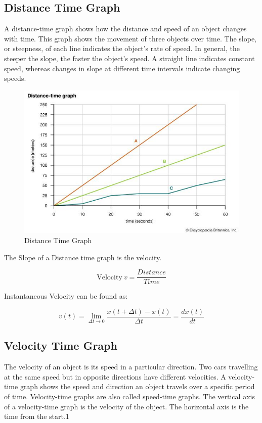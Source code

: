 \documentclass[11pt]{article}
\begin{document}
\subsection{Distance Time Graph}
A distance-time graph shows how the distance and speed of an object changes with time. This graph shows the movement of three objects over time. The slope, or steepness, of each line indicates the object's rate of speed. In general, the steeper the slope, the faster the object's speed. A straight line indicates constant speed, whereas changes in slope at different time intervals indicate changing speeds.

\begin{figure}[H]
	\centering
	\includegraphics[scale=0.5]{st graph.jpg}
	\caption{Distance Time Graph}
\end{figure}


The Slope of a Distance time graph is the velocity.

$$ \mathrm{Velocity}\ v = \frac{Distance}{Time} $$

Instantaneous Velocity can be found as:

\begin{equation}
	v(t)=\lim _{\Delta t \rightarrow 0} \frac{x(t+\Delta t)-x(t)}{\Delta t}=\frac{d x(t)}{d t}
\end{equation}

\subsection{Velocity Time Graph}
The velocity of an object is its speed in a particular direction. Two cars travelling at the same speed but in opposite directions have different velocities. A velocity-time graph shows the speed and direction an object travels over a specific period of time. Velocity-time graphs are also called speed-time graphs. The vertical axis of a velocity-time graph is the velocity of the object. The horizontal axis is the time from the start.1
\end{document}

